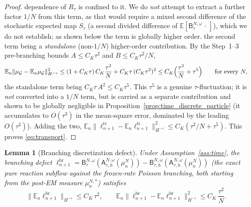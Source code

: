 \documentclass[a4paper,fleqn]{cas-sc}
\newtheorem{lemma}[theorem]{Lemma}
\theoremstyle{definition}
\theoremstyle{remark}
\begin{document}
\begin{proof}
dependence of $R_\tau$ is confined to it. We do \emph{not} attempt to extract a further
factor $1/N$ from this term, as that would require a mixed second difference of the
stochastic expected map $S_\tau$ (a second divided difference of
$\mathbb E[\mathsf B^{N,\omega}_\tau\,\cdot\,]$), which we do not establish; as shown
below the term is globally higher order.
the second term being a \emph{standalone} (non-$1/N$) higher-order contribution. By
the Step~1--3 pre-branching bounds $A\le C_K\tau^2$ and $B\le C_K\tau^2/N$,
\[
\mathbb E_n\|\mu_{\mathcal G}-\mathbb E_n\mu_{\mathcal G}\|_{H^{-s}}^2
\le(1+C_K\tau)\,C_K\frac{\tau^2}{N}+C_K\tau\,(C_K\tau^2)^2
\le C_K\Bigl(\frac{\tau^2}{N}+\tau^5\Bigr)
\qquad\text{for every }N,
\]
the standalone term being $C_K\tau\,A^2\le C_K\tau^5$. This $\tau^5$ is a genuine
$\tau$-fluctuation; it is \emph{not} converted into a $1/N$ term, but is carried as a
separate contribution and shown to be globally negligible in
Proposition~\ref{prop:time_discrete_particle} (it accumulates to $O(\tau^3)$ in the
mean-square error, dominated by the leading $O(\tau^2)$).
Adding the two, $\mathbb E_n\|\ell^{\mathrm{tr}}_{n+1}-\mathbb E_n\ell^{\mathrm{tr}}_{n+1}\|_{H^{-s}}^2
\le C_K(\tau^2/N+\tau^5)$. This proves \eqref{eq:transport}.
\end{proof}

\begin{lemma}[Branching discretization defect]\label{lem:branch}
Under Assumption~\ref{ass:time}, the branching defect
$\ell^{\mathrm{br}}_{n+1}=\mathsf B^{N,\omega}_\tau(\mathsf A^{N,\omega}_{\tau,h}(\mu^N_n))
-\mathsf B^{N,\omega}_{\tau,h}(\mathsf A^{N,\omega}_{\tau,h}(\mu^N_n))$ (the exact
pure reaction subflow against the frozen-rate Poisson branching, both starting
from the post-EM measure $\mu^{N,*}_n$) satisfies
\begin{equation}\label{eq:branch}
\|\mathbb E_n\ell^{\mathrm{br}}_{n+1}\|_{H^{-s}}\le C_K\,\tau^2,
\qquad
\mathbb E_n\|\ell^{\mathrm{br}}_{n+1}-\mathbb E_n\ell^{\mathrm{br}}_{n+1}\|_{H^{-s}}^2
\le C_K\,\frac{\tau^2}{N}.
\end{equation}
\end{lemma}
\end{document}
